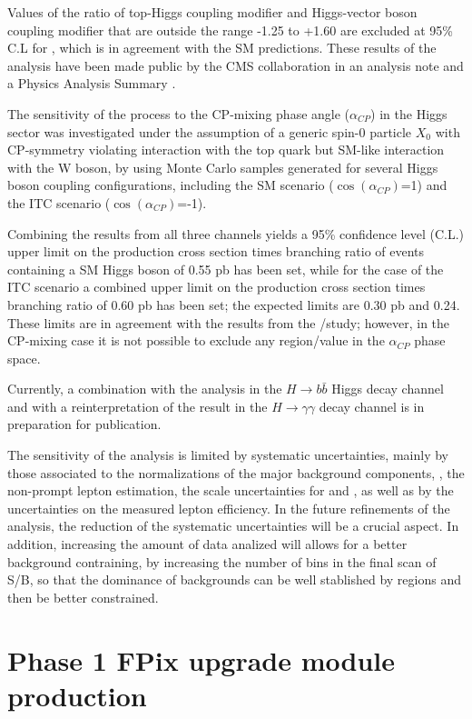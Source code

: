 Values of the ratio of top-Higgs coupling modifier \Ct and Higgs-vector boson coupling modifier \CV that are outside the range -1.25 to +1.60 are excluded at 95\% C.L for , which is in agreement with the SM predictions. These results of the analysis have been made public by the CMS collaboration in an analysis note \cite{CMS_AN_2016-378} and a Physics Analysis Summary \cite{CMS_PAS_HIG_17-005}.

The sensitivity of the \tH process to the CP-mixing phase angle ($\alpha_{CP}$) in the Higgs sector was investigated under the assumption of a generic spin-0 particle $X_0$ with CP-symmetry violating interaction with the top quark but SM-like interaction with the W boson, by using Monte Carlo samples generated for several Higgs boson coupling configurations, including the SM scenario ($\cos(\alpha_{CP})$=1) and the ITC scenario ($\cos (\alpha_{CP})$=-1).  

Combining the results from all three channels yields a 95\% confidence level (C.L.) upper limit on the production cross section times branching ratio of events containing a SM Higgs boson of 0.55 pb has been set, while for the case of the ITC scenario a combined upper limit on the production cross section times branching ratio of 0.60 pb has been set; the expected limits are 0.30 pb and 0.24. These limits are in agreement with the results from the \Ct/\CV study; however, in the CP-mixing case it is not possible to exclude any region/value in the $\alpha_{CP}$ phase space.

Currently, a combination with the \tH analysis in the $H \to b\bar{b}$ Higgs decay channel and with a reinterpretation of the \ttH result in the $H\to \gamma\gamma$ decay channel is in preparation for publication.

The sensitivity of the analysis is limited by systematic uncertainties, mainly by those associated to the normalizations of the major background components, \ie, the non-prompt lepton estimation, the scale uncertainties for \ttW and \ttZ, as well as by the uncertainties on the measured lepton efficiency. In the future refinements of the analysis,  the reduction of the systematic uncertainties will be a crucial aspect. In addition, increasing the amount of data analized will allows for a better background contraining, by increasing the number of bins in the final scan of S/B, so that the dominance of backgrounds can be well stablished by regions and then be better constrained.       
 
\section{Phase 1 FPix upgrade module production}

